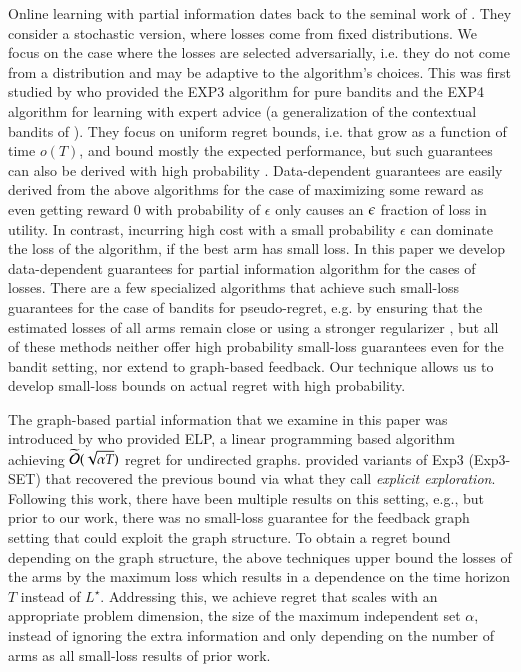 Online learning with partial information dates back to the seminal work of \cite{Lai1985}. They consider a stochastic version, where losses come from fixed distributions. We focus on the case where the losses are selected adversarially, i.e. they do not come from a distribution and may be adaptive to the algorithm's choices. This was first studied by \cite{Auer2003} who provided the EXP3 algorithm for pure bandits and the EXP4 algorithm for learning with expert advice (a generalization of the contextual bandits of \cite{Langford2007}). They focus on uniform regret bounds, i.e. that grow as a function of time $o(T)$, and bound mostly the expected performance, but such guarantees can also be derived with high probability \citep{Auer2003,AudibertB10,pmlr-v15-beygelzimer11a}. Data-dependent guarantees are easily derived from the above algorithms for the case of maximizing some reward  as even getting reward $0$ with probability of $\epsilon$ only causes an $\epsilon$ fraction of loss in utility. In contrast, incurring high cost with a small probability $\epsilon$ can dominate the loss of the algorithm, if the best arm has small loss. In this paper we develop 
data-dependent guarantees for partial information algorithm for the cases of losses. There are a few specialized algorithms that achieve such small-loss guarantees for the case of bandits for pseudo-regret, e.g. by ensuring that the estimated losses of all arms remain close \citep{Allenberg2006,Neu15_semibandits} or using a stronger regularizer \citep{RakhlinS13predictablesequences,FosterLLST16}, but all of these methods neither offer high probability small-loss guarantees even for the bandit setting, nor extend to graph-based feedback. Our technique allows us to develop small-loss bounds on actual regret with high probability. 

The graph-based
partial information that we examine in this paper 
was introduced by \cite{MannorS11} who provided ELP, a linear programming based algorithm achieving
$\widetilde{\mathcal{O}}{(\sqrt{\alpha T})}$ regret for undirected graphs. \cite{AlonCGM13,AlonCGMMS} provided variants of Exp3  (Exp3-SET) that recovered the previous bound via what they call \emph{explicit exploration}. Following this work, there have been multiple results on this setting, e.g.\citep{AlonCBDK15,Cohen2016, KocakNV16, tossou:aaai2017b}, but prior to our work, there was no small-loss guarantee for the feedback graph setting that could exploit the graph structure. To obtain a regret bound depending on the graph structure, the above techniques upper bound the losses of the arms by the maximum loss which results in a dependence on the time horizon $T$ instead of $L^{\star}$. Addressing this, we achieve regret that scales with an appropriate problem dimension, the size of the maximum independent set $\alpha$, instead of ignoring the extra information and only depending on the number of arms as all small-loss results of prior work.

